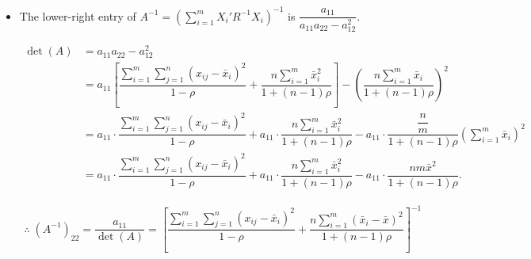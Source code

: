 \documentclass[11pt, a4paper]{article}
\begin{document}
\begin{itemize}
\begin{enumerate}[I.]
\item \begin{align*}
a_{22}
&= \sum\limits_{i=1}^{m} \dfrac{1}{1-\rho}
\left[
\sum\limits_{j=1}^{n} x_{ij}^2
- \dfrac{\rho}{1+(n-1)\rho}
\left(\sum\limits_{j=1}^{n} x_{ij}\right)^2
\right] \\[6pt]
&= \sum\limits_{i=1}^{m} \dfrac{1}{1-\rho}
\left[
\sum\limits_{j=1}^{n} (x_{ij} - \bar{x}_i)^2
+ n\bar{x}_i^2
- \dfrac{\rho}{1+(n-1)\rho} \cdot n^2 \bar{x}_i^2
\right] \\[6pt]
&= \sum\limits_{i=1}^{m} \dfrac{1}{1-\rho}
\left[
\sum\limits_{j=1}^{n} (x_{ij} - \bar{x}_i)^2
+ \dfrac{n(1-\rho)}{1+(n-1)\rho} \bar{x}_i^2
\right] \\[6pt]
&= \dfrac{1}{1-\rho}
\sum\limits_{i=1}^{m} \sum\limits_{j=1}^{n} (x_{ij} - \bar{x}_i)^2
+ \dfrac{n}{1+(n-1)\rho}
\sum\limits_{i=1}^{m} \bar{x}_i^2.
\end{align*}
\end{enumerate}

\item[\scalebox{2.0}{\twemoji{keycap: 3}}] \hspace{0.2cm} The lower-right entry of $A^{-1} = \left( \sum\limits_{i=1}^{m} X_i' R^{-1} X_i \right)^{-1}$ is $\dfrac{a_{11}}{a_{11}a_{22} - a_{12}^2}$.

\begin{align*}
\det(A) 
&= a_{11}a_{22} - a_{12}^2 \\[6pt]
&= a_{11} \left[
\dfrac{\sum\limits_{i=1}^{m} \sum\limits_{j=1}^{n} (x_{ij}-\bar{x}_i)^2}{1-\rho}
+ \dfrac{n \sum\limits_{i=1}^{m} \bar{x}_i^2}{1+(n-1)\rho}
\right]
- \left(
\dfrac{n \sum\limits_{i=1}^{m} \bar{x}_i}{1+(n-1)\rho}
\right)^2 \\[8pt]
&= a_{11} \cdot \dfrac{\sum\limits_{i=1}^{m} \sum\limits_{j=1}^{n} (x_{ij}-\bar{x}_i)^2}{1-\rho}
+ a_{11} \cdot \dfrac{n \sum\limits_{i=1}^{m} \bar{x}_i^2}{1+(n-1)\rho}
- a_{11} \cdot \dfrac{\dfrac{n}{m}}{1+(n-1)\rho}
\left(\sum\limits_{i=1}^{m} \bar{x}_i \right)^2 \\[8pt]
&= a_{11} \cdot \dfrac{\sum\limits_{i=1}^{m} \sum\limits_{j=1}^{n} (x_{ij}-\bar{x}_i)^2}{1-\rho}
+ a_{11} \cdot \dfrac{n \sum\limits_{i=1}^{m} \bar{x}_i^2}{1+(n-1)\rho}
- a_{11} \cdot \dfrac{nm \bar{x}^2}{1+(n-1)\rho}.
\end{align*}

\begin{align*}
\therefore \; (A^{-1})_{22} = \dfrac{a_{11}}{\det(A)}
=
\left[
\dfrac{\sum\limits_{i=1}^{m} \sum\limits_{j=1}^{n} (x_{ij}-\bar{x}_i)^2}{1-\rho}
+
\dfrac{n \sum\limits_{i=1}^{m} (\bar{x}_i - \bar{x})^2}{1+(n-1)\rho}
\right]^{-1}
\end{align*}


\end{itemize}
\end{document}
